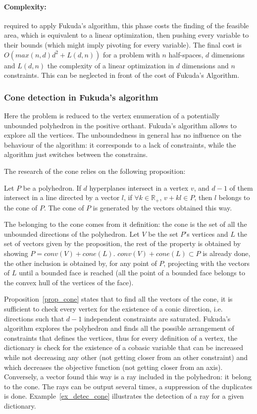 \paragraph{Complexity:} required to apply Fukuda's algorithm, this phase costs the finding of the feasible area, which is equivalent to a linear optimization, then pushing every variable to their bounds (which might imply pivoting for every variable). The final cost is $O(max(n,d)d^2+L(d,n))$ for a problem with $n$ half-spaces, $d$ dimensions and $L(d,n)$ the complexity of a linear optimization in $d$ dimensions and $n$ constraints. This can be neglected in front of the cost of Fukuda's Algorithm.

\subsubsection{Cone detection in Fukuda's algorithm}

Here the problem is reduced to the vertex enumeration of a potentially unbounded polyhedron in the positive orthant. Fukuda's algorithm allows to explore all the vertices. The unboundedness in general has no influence on the behaviour of the algorithm: it corresponds to a lack of constraints, while the algorithm just switches between the constrains.

The research of the cone relies on the following proposition:
\begin{proposition}
Let $P$ be a polyhedron. If $d$ hyperplanes intersect in a vertex $v$, and $d-1$ of them intersect in a line directed by a vector $l$, if $\forall k\in \mathbb{R}_+$, $v+kl\in P$, then $l$ belongs to the cone of $P$. The cone of $P$ is generated by the vectors obtained this way.
\label{prop_cone}
\end{proposition}

The belonging to the cone comes from it definition: the cone is the set of all the unbounded directions of the polyhedron. Let $V$ be the set $P$'s vertices and $L$ the set of vectors given by the proposition, the rest of the property is obtained by showing $P=conv(V)+cone(L)$. $conv(V)+cone(L)\subset P$ is already done, the other inclusion is obtained by, for any point of $P$, projecting with the vectors of $L$ until a bounded face is reached (all the point of a bounded face belongs to the convex hull of the vertices of the face).

Proposition~\ref{prop_cone} states that to find all the vectors of the cone, it is sufficient to check every vertex for the existence of a conic direction, i.e. directions such that $d-1$ independent constraints are saturated. Fukuda's algorithm explores the polyhedron and finds all the possible arrangement of constraints that defines the vertices, thus for every definition of a vertex, the dictionary is check for the existence of a cobasic variable that can be increased while not decreasing any other (not getting closer from an other constraint) and which decreases the objective function (not getting closer from an axis). Conversely, a vector found this way is a ray included in the polyhedron: it belong to the cone. The rays can be output several times, a suppression of the duplicates is done. Example~\ref{ex_detec_cone} illustrates the detection of a ray for a given dictionary.

